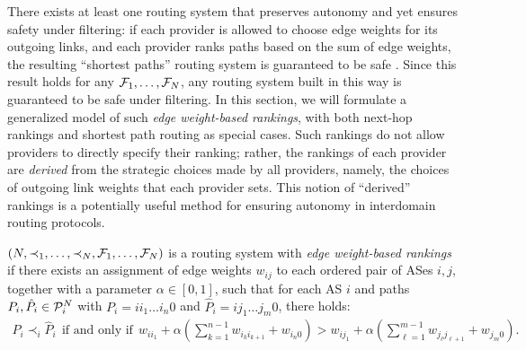 There exists at least one routing system that preserves autonomy and yet
ensures safety under filtering: if each provider is allowed to choose
edge weights for its outgoing links, and each provider ranks paths based
on the sum of edge weights, the resulting ``shortest paths'' routing
system is guaranteed to be safe \cite{Griffin2002c}.  Since this result
holds for any $\F_1, \ldots, \F_N$, any routing system built in this way
is guaranteed to be safe under filtering.  In this section, we will
formulate a generalized model of such {\em edge weight-based rankings},
with both next-hop rankings and shortest path routing as special cases.
Such rankings do not allow providers to directly specify their ranking;
rather, the rankings of each provider are {\em derived} from the
strategic choices made by all providers, namely, the choices of outgoing
link weights that each provider sets.  This notion of ``derived''
rankings is a potentially useful method for ensuring autonomy in
interdomain routing protocols.

\begin{defn}
$\lb(N,\prec_1,\ldots,\prec_N, \F_1, \ldots, \F_N)$ is a routing
system with {\em edge weight-based
rankings} if there exists an assignment of edge weights $w_{ij}$ to
each ordered pair of ASes $i,j$, together with a parameter $\alpha \in
[0, 1]$, such that for each AS $i$ and paths $P_i, \hat{P}_i \in \P_i^N$
with $P_i = i i_1 \ldots i_n 0$ and $\hat{P}_i = i j_1 \ldots j_m 0$,
there holds:
\begin{multline*}
P_i \prec_i \hat{P}_i\ \ \textrm{if and only if}\ \ w_{ii_1} + \alpha
\left( \sum_{k = 1}^{n-1} w_{i_k i_{k+1}} + w_{i_n 0}\right) >
w_{ij_1} + \alpha \left(\sum_{\ell =
1}^{m-1} w_{j_\ell j_{\ell+1}} + w_{j_m 0}\right).
\end{multline*}
\end{defn}


